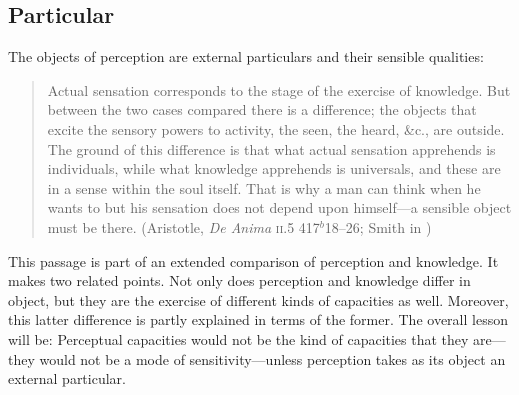 

\subsection{Particular} %
\label{sub:particular}
The objects of perception are external particulars and their sensible qualities:
\begin{quote}
	Actual sensation corresponds to the stage of the exercise of knowledge. But between the two cases compared there is a difference; the objects that excite the sensory powers to activity, the seen, the heard, \&c., are outside. The ground of this difference is that what actual sensation apprehends is individuals, while what knowledge apprehends is universals, and these are in a sense within the soul itself. That is why a man can think when he wants to but his sensation does not depend upon himself---a sensible object must be there. (Aristotle, \emph{De Anima} \textsc{ii}.5 417\( ^{b} \)18--26; Smith in \citealt[31]{Barnes:1984uq})
\end{quote}
This passage is part of an extended comparison of perception and knowledge. It makes two related points. Not only does perception and knowledge differ in object, but they are the exercise of different kinds of capacities as well. Moreover, this latter difference is partly explained in terms of the former. The overall lesson will be: Perceptual capacities would not be the kind of capacities that they are---they would not be a mode of sensitivity---unless perception takes as its object an external particular.

